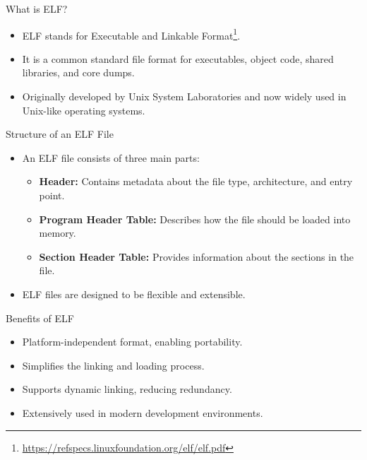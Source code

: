 
\begin{frame}{What is ELF?}
    \begin{itemize}
        \item ELF stands for Executable and Linkable Format\footnote{\url{https://refspecs.linuxfoundation.org/elf/elf.pdf}}.
        \item It is a common standard file format for executables, object code, shared libraries, and core dumps.
        \item Originally developed by Unix System Laboratories and now widely used in Unix-like operating systems.
    \end{itemize}
\end{frame}

\begin{frame}{Structure of an ELF File}
    \begin{itemize}
        \item An ELF file consists of three main parts:
        \begin{itemize}
            \item \textbf{Header:} Contains metadata about the file type, architecture, and entry point.
            \item \textbf{Program Header Table:} Describes how the file should be loaded into memory.
            \item \textbf{Section Header Table:} Provides information about the sections in the file.
        \end{itemize}
        \item ELF files are designed to be flexible and extensible.
    \end{itemize}
\end{frame}

\begin{frame}{Benefits of ELF}
    \begin{itemize}
        \item Platform-independent format, enabling portability.
        \item Simplifies the linking and loading process.
        \item Supports dynamic linking, reducing redundancy.
        \item Extensively used in modern development environments.
    \end{itemize}
\end{frame}

